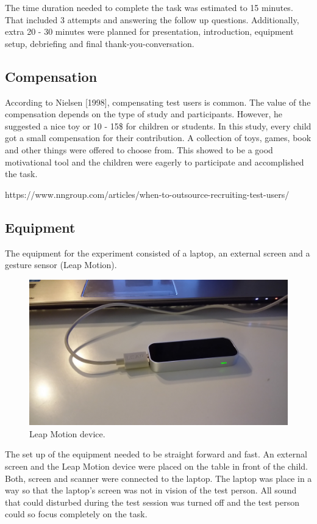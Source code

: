 The time duration needed to complete the task was estimated to 15 minutes. That included 3 attempts and answering the follow up questions. Additionally, extra 20 - 30 minutes were planned for presentation, introduction, equipment setup, debriefing and final thank-you-conversation.

\subsection{Compensation}

According to Nielsen [1998], compensating test users is common. The value of the compensation depends on the type of study and participants. However, he suggested a nice toy or 10 - 15\$ for children or students.
In this study, every child got a small compensation for their contribution. A collection of toys, games, book and other things were offered to choose from. This showed to be a good motivational tool and the children were eagerly to participate and accomplished the task.  

https://www.nngroup.com/articles/when-to-outsource-recruiting-test-users/



\subsection{Equipment}

The equipment for the experiment consisted of a laptop, an external screen and a gesture sensor (Leap Motion). 

\begin{figure}[h]  %
  \centering
  \includegraphics[width=.5\textwidth]{figures/LMdevice.jpg}
  \caption[Leap Motion device.]{Leap Motion device.}
  \label{fig:setup}
\end{figure}

The set up of the equipment needed to be straight forward and fast. An external screen and the Leap Motion device were placed on the table in front of the child. Both, screen and scanner were connected to the laptop. The laptop was place in a way so that the laptop’s screen was not in vision of the test person. All sound that could disturbed during the test session was turned off and the test person could so focus completely on the task.

